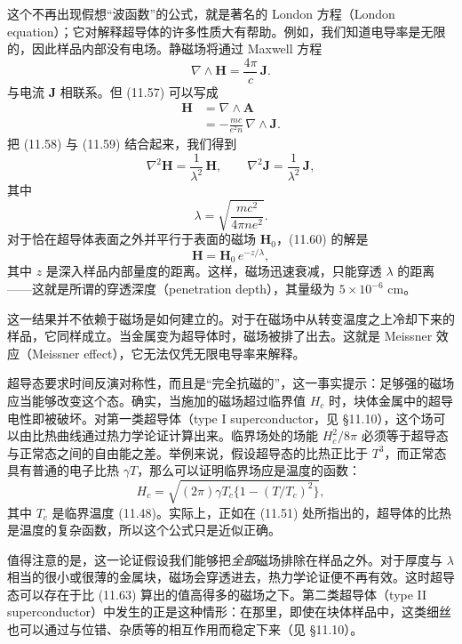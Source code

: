 这个不再出现假想“波函数”的公式，就是著名的 London 方程（London equation）；它对解释超导体的许多性质大有帮助。例如，我们知道电导率是无限的，因此样品内部没有电场。静磁场将通过 Maxwell 方程
\begin{equation*}
\nabla\wedge\mathbf{H} = \frac{4\pi}{c}\,\mathbf{J}. \tag{11.58}
\end{equation*}
与电流 $\mathbf{J}$ 相联系。但 (11.57) 可以写成
\begin{align*}
\mathbf{H} &= \nabla\wedge\mathbf{A}\\
&= -\frac{mc}{e^{2}n}\,\nabla\wedge\mathbf{J}. \tag{11.59}
\end{align*}
把 (11.58) 与 (11.59) 结合起来，我们得到
\begin{equation*}
\nabla^{2}\mathbf{H} = \frac{1}{\lambda^{2}}\,\mathbf{H}, \qquad \nabla^{2}\mathbf{J} = \frac{1}{\lambda^{2}}\,\mathbf{J}, \tag{11.60}
\end{equation*}
其中
\begin{equation*}
\lambda = \sqrt{\frac{mc^{2}}{4\pi ne^{2}}}. \tag{11.61}
\end{equation*}
对于恰在超导体表面之外并平行于表面的磁场 $\mathbf{H}_0$，(11.60) 的解是
\begin{equation*}
\mathbf{H} = \mathbf{H}_0\,e^{-z/\lambda}, \tag{11.62}
\end{equation*}
其中 $z$ 是深入样品内部量度的距离。这样，磁场迅速衰减，只能穿透 $\lambda$ 的距离——这就是所谓的穿透深度（penetration depth），其量级为 $5\times10^{-6}$ cm。

这一结果并不依赖于磁场是如何建立的。对于在磁场中从转变温度之上冷却下来的样品，它同样成立。当金属变为超导体时，磁场被排了出去。这就是 Meissner 效应（Meissner effect），它无法仅凭无限电导率来解释。

超导态要求时间反演对称性，而且是“完全抗磁的”，这一事实提示：足够强的磁场应当能够改变这个态。确实，当施加的磁场超过临界值 $H_c$ 时，块体金属中的超导电性即被破坏。对第一类超导体（type I superconductor，见 §11.10），这个场可以由比热曲线通过热力学论证计算出来。临界场处的场能 $H_c^{2}/8\pi$ 必须等于超导态与正常态之间的自由能之差。举例来说，假设超导态的比热正比于 $T^{3}$，而正常态具有普通的电子比热 $\gamma T$，那么可以证明临界场应是温度的函数：
\begin{equation*}
H_c = \sqrt{(2\pi)\gamma T_c\{1-(T/T_c)^{2}\}}, \tag{11.63}
\end{equation*}
其中 $T_c$ 是临界温度 (11.48)。实际上，正如在 (11.51) 处所指出的，超导体的比热是温度的复杂函数，所以这个公式只是近似正确。

值得注意的是，这一论证假设我们能够把\emph{全部}磁场排除在样品之外。对于厚度与 $\lambda$ 相当的很小或很薄的金属块，磁场会穿透进去，热力学论证便不再有效。这时超导态可以存在于比 (11.63) 算出的值高得多的磁场之下。第二类超导体（type II superconductor）中发生的正是这种情形：在那里，即使在块体样品中，这类细丝也可以通过与位错、杂质等的相互作用而稳定下来（见 §11.10）。


